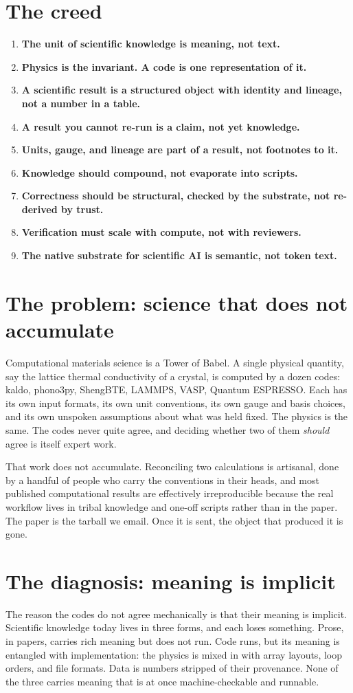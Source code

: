 \documentclass[11pt,a4paper]{article}
\newcommand{\creed}[1]{\item \textbf{#1}}
\begin{document}
\section*{\color{abstrcol}The creed}
\begin{enumerate}[leftmargin=1.4em, itemsep=0.35em]
  \creed{The unit of scientific knowledge is meaning, not text.}
  \creed{Physics is the invariant. A code is one representation of it.}
  \creed{A scientific result is a structured object with identity and lineage, not a number in a table.}
  \creed{A result you cannot re-run is a claim, not yet knowledge.}
  \creed{Units, gauge, and lineage are part of a result, not footnotes to it.}
  \creed{Knowledge should compound, not evaporate into scripts.}
  \creed{Correctness should be structural, checked by the substrate, not re-derived by trust.}
  \creed{Verification must scale with compute, not with reviewers.}
  \creed{The native substrate for scientific AI is semantic, not token text.}
\end{enumerate}

\section{The problem: science that does not accumulate}

Computational materials science is a Tower of Babel. A single physical quantity,
say the lattice thermal conductivity of a crystal, is computed by a dozen codes:
kaldo, phono3py, ShengBTE, LAMMPS, VASP, Quantum ESPRESSO. Each has its own input
formats, its own unit conventions, its own gauge and basis choices, and its own
unspoken assumptions about what was held fixed. The physics is the same. The codes
never quite agree, and deciding whether two of them \emph{should} agree is itself
expert work.

That work does not accumulate. Reconciling two calculations is artisanal, done by
a handful of people who carry the conventions in their heads, and most published
computational results are effectively irreproducible because the real workflow
lives in tribal knowledge and one-off scripts rather than in the paper. The paper
is the tarball we email. Once it is sent, the object that produced it is gone.

\section{The diagnosis: meaning is implicit}

The reason the codes do not agree mechanically is that their meaning is implicit.
Scientific knowledge today lives in three forms, and each loses something. Prose,
in papers, carries rich meaning but does not run. Code runs, but its meaning is
entangled with implementation: the physics is mixed in with array layouts, loop
orders, and file formats. Data is numbers stripped of their provenance. None of
the three carries meaning that is at once machine-checkable and runnable.
\end{document}
